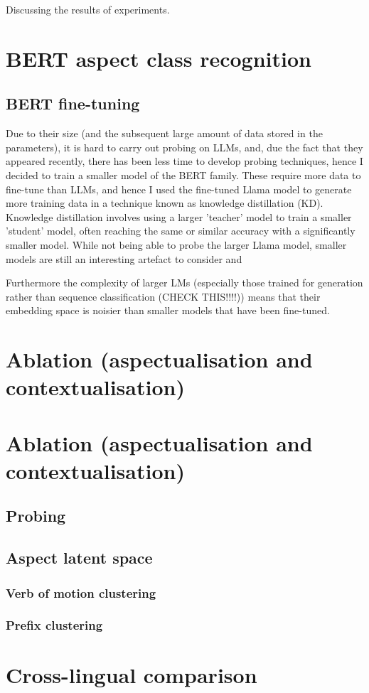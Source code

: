 Discussing the results of experiments.

\section{BERT aspect class recognition}

\subsection*{BERT fine-tuning}
Due to their size (and the subsequent large amount of data stored in the parameters), it is hard to carry out probing on LLMs, and, due the fact that they appeared recently, there has been less time to develop probing techniques, hence I decided to train a smaller model of the BERT \citep{devlin2019bert} family. These require more data to fine-tune than LLMs, and hence I used the fine-tuned Llama model to generate more training data in a technique known as knowledge distillation (KD). Knowledge distillation involves using a larger 'teacher' model to train a smaller 'student' model, often reaching the same or similar accuracy with a significantly smaller model. While not being able to probe the larger Llama model, smaller models are still an interesting artefact to consider and 

Furthermore the complexity of larger LMs (especially those trained for generation rather than sequence classification (CHECK THIS!!!!)) means that their embedding space is noisier than smaller models that have been fine-tuned.

\section{Ablation (aspectualisation and contextualisation)}

\section{Ablation (aspectualisation and contextualisation)}

\subsection{Probing}
\subsection{Aspect latent space}
\subsubsection{Verb of motion clustering}
\subsubsection{Prefix clustering}

\section*{Cross-lingual comparison}